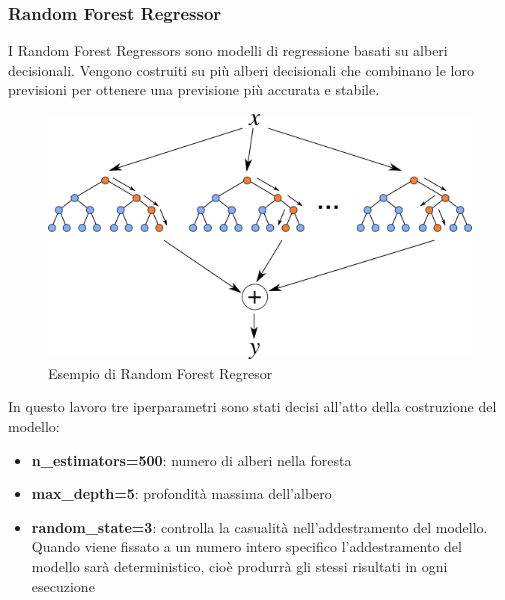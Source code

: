 \subsubsection{Random Forest Regressor}
I Random Forest Regressors sono modelli di regressione basati su alberi decisionali. Vengono costruiti su più alberi decisionali che combinano le loro previsioni per ottenere una previsione più accurata e stabile.
\begin{figure}[H]
    \centering
    \includegraphics[scale=0.5]{images/RandomForestRegressor.png}
    \caption*{Esempio di Random Forest Regresor}
\end{figure}

\noindent In questo lavoro tre iperparametri sono stati decisi all'atto della costruzione del modello:
\begin{itemize}
    \item \textbf{n\_estimators=500}: numero di alberi nella foresta
    \item \textbf{max\_depth=5}: profondità massima dell'albero
    \item \textbf{random\_state=3}:  controlla la casualità nell'addestramento del modello. Quando viene fissato a un numero intero specifico l'addestramento del modello sarà deterministico, cioè produrrà gli stessi risultati in ogni esecuzione
\end{itemize}

